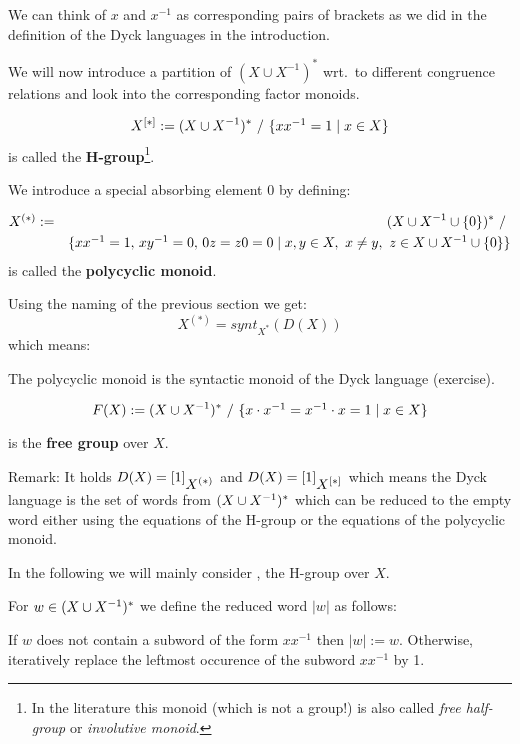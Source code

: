 We can think of $x$ and $x^{-1}$ as corresponding pairs of
brackets as we did in the definition of the Dyck languages in the introduction.

We will now introduce a partition of $(X \cup X^{-1})^*$ wrt.\ to
different congruence relations and look into the corresponding factor monoids.

\begin{definition}
\[ \hgroup{X} := (\unioninv{X})^*\ /\ \setof{x x^{-1} = 1 \mid x \in X} \] is
called the {\bf H-group}\footnote{In the literature this monoid (which is not a
group!) is also called {\em free half-group} or {\em involutive monoid}.}.
\end{definition}

We introduce a special absorbing element $0$ by defining:
\begin{definition}
\begin{eqnarray*}
\mbox{${X}^{(*)}$} & := & (X \cup {X}^{-1} \cup \mbox{$\{0\}$})^*\ /\ \\
& & \mbox{$\{x x^{-1} = 1,\,x y^{-1} = 0,\,0 z = z 0 = 0 \mid x,y \in X,\ x\neq
y,\ z \in X \cup {X}^{-1} \cup \mbox{$\{0\}$}\}$}
\end{eqnarray*}
is called the {\bf polycyclic monoid}.
\end{definition}

Using the naming of the previous section we get:
\[ X^{(*)} = synt_{X^*}(D(X)) \]
which means:

The polycyclic monoid is the syntactic monoid of the Dyck language (exercise).

\begin{definition}
\[ F(X) := (X \cup {X}^{-1})^*\ /\ \mbox{$\{x \cdot x^{-1} = x^{-1} \cdot x = 1 \mid
x \in X\}$}
\]
\end{definition}
is the {\bf free group} over $X$.

Remark: It holds $D(X) = [1]_{\mbox{${X}^{(*)}$}}$ and $D(X) = [1]_{\mbox{${X}^{[*]}$}}$ which
means the Dyck language is the set of words from $(X \cup {X}^{-1})^*$ which can be
reduced to the empty word either using the equations of the H-group or the
equations of the polycyclic monoid.

In the following we will mainly consider , the H-group over $X$.

For $w \in (X \cup {X}^{-1})^*$ we define the reduced word $|w|$ as follows: 

If $w$ does not contain a subword of the form $x x^{-1}$ then $|w| := w$.
Otherwise, iteratively replace the leftmost occurence of the subword $x
x^{-1}$ by 1.

